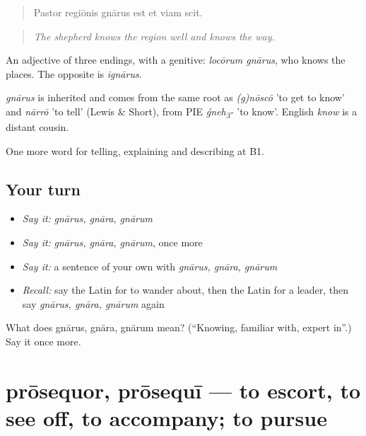 \begin{quote}
Pastor regiōnis gnārus est et viam scit.
\end{quote}

\begin{quote}
\emph{The shepherd knows the region well and knows the way.}
\end{quote}

An adjective of three endings, with a genitive: \emph{locōrum gnārus}, who knows the places. The opposite is \emph{ignārus}.

\begin{cousinweb}
\emph{gnārus} is inherited and comes from the same root as \emph{(g)nōscō} 'to get to know' and \emph{nārrō} 'to tell' (Lewis \& Short), from PIE \emph{ǵneh\textsubscript{3}-} 'to know'. English \emph{know} is a distant cousin.
\end{cousinweb}

\begin{grammarlens}[title={What you've built}]
One more word for telling, explaining and describing at B1.
\end{grammarlens}

\subsection*{Your turn}
\begin{itemize}
\raggedright
  \item \emph{Say it:} \emph{gnārus, gnāra, gnārum}
  \item \emph{Say it:} \emph{gnārus, gnāra, gnārum}, once more
  \item \emph{Say it:} a sentence of your own with \emph{gnārus, gnāra, gnārum}
  \item \emph{Recall:} say the Latin for to wander about, then the Latin for a leader, then say \emph{gnārus, gnāra, gnārum} again
\end{itemize}

\begin{tcolorbox}[breakable,colback=teal!4,colframe=teal!35!black,title={Before you move on}]
What does gnārus, gnāra, gnārum mean? (\textquotedblleft{}Knowing, familiar with, expert in\textquotedblright{}.) Say it once more.
\end{tcolorbox}
\section[prōsequor, prōsequī]{prōsequor, prōsequī — to escort, to see off, to accompany; to pursue}

